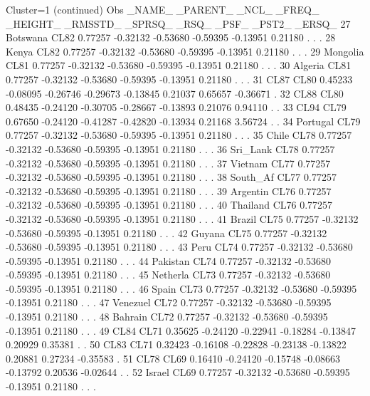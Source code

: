\documentclass{article}
\begin{document}
\begin{Woutput}
Cluster=1
(continued)
Obs _NAME_   _PARENT_   _NCL_   _FREQ_  _HEIGHT_ _RMSSTD_  _SPRSQ_  _RSQ_    _PSF_   _PST2_  _ERSQ_
 27 Botswana   CL82    0.77257 -0.32132 -0.53680 -0.59395 -0.13951 0.21180   .        .         .
 28 Kenya      CL82    0.77257 -0.32132 -0.53680 -0.59395 -0.13951 0.21180   .        .         .
 29 Mongolia   CL81    0.77257 -0.32132 -0.53680 -0.59395 -0.13951 0.21180   .        .         .
 30 Algeria    CL81    0.77257 -0.32132 -0.53680 -0.59395 -0.13951 0.21180   .        .         .
 31 CL87       CL80    0.45233 -0.08095 -0.26746 -0.29673 -0.13845 0.21037  0.65657 -0.36671    .
 32 CL88       CL80    0.48435 -0.24120 -0.30705 -0.28667 -0.13893 0.21076  0.94110   .         .
 33 CL94       CL79    0.67650 -0.24120 -0.41287 -0.42820 -0.13934 0.21168  3.56724   .         .
 34 Portugal   CL79    0.77257 -0.32132 -0.53680 -0.59395 -0.13951 0.21180   .        .         .
 35 Chile      CL78    0.77257 -0.32132 -0.53680 -0.59395 -0.13951 0.21180   .        .         .
 36 Sri_Lank   CL78    0.77257 -0.32132 -0.53680 -0.59395 -0.13951 0.21180   .        .         .
 37 Vietnam    CL77    0.77257 -0.32132 -0.53680 -0.59395 -0.13951 0.21180   .        .         .
 38 South_Af   CL77    0.77257 -0.32132 -0.53680 -0.59395 -0.13951 0.21180   .        .         .
 39 Argentin   CL76    0.77257 -0.32132 -0.53680 -0.59395 -0.13951 0.21180   .        .         .
 40 Thailand   CL76    0.77257 -0.32132 -0.53680 -0.59395 -0.13951 0.21180   .        .         .
 41 Brazil     CL75    0.77257 -0.32132 -0.53680 -0.59395 -0.13951 0.21180   .        .         .
 42 Guyana     CL75    0.77257 -0.32132 -0.53680 -0.59395 -0.13951 0.21180   .        .         .
 43 Peru       CL74    0.77257 -0.32132 -0.53680 -0.59395 -0.13951 0.21180   .        .         .
 44 Pakistan   CL74    0.77257 -0.32132 -0.53680 -0.59395 -0.13951 0.21180   .        .         .
 45 Netherla   CL73    0.77257 -0.32132 -0.53680 -0.59395 -0.13951 0.21180   .        .         .
 46 Spain      CL73    0.77257 -0.32132 -0.53680 -0.59395 -0.13951 0.21180   .        .         .
 47 Venezuel   CL72    0.77257 -0.32132 -0.53680 -0.59395 -0.13951 0.21180   .        .         .
 48 Bahrain    CL72    0.77257 -0.32132 -0.53680 -0.59395 -0.13951 0.21180   .        .         .
 49 CL84       CL71    0.35625 -0.24120 -0.22941 -0.18284 -0.13847 0.20929  0.35381   .         .
 50 CL83       CL71    0.32423 -0.16108 -0.22828 -0.23138 -0.13822 0.20881  0.27234 -0.35583    .
 51 CL78       CL69    0.16410 -0.24120 -0.15748 -0.08663 -0.13792 0.20536 -0.02644   .         .
 52 Israel     CL69    0.77257 -0.32132 -0.53680 -0.59395 -0.13951 0.21180   .        .         .

\end{Woutput}
\end{document}
